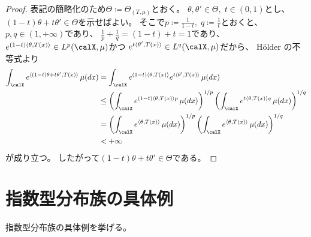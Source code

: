 \documentclass[report]{jlreq}
\begin{document}
\begin{proof}
    表記の簡略化のため$\Theta \coloneqq \Theta_{(T, \mu)}$とおく。
    $\theta, \theta' \in \Theta, \; t \in (0, 1)$とし、
    $(1 - t) \theta + t \theta' \in \Theta$を示せばよい。
    そこで$p \coloneqq \frac{1}{1 - t}, \; q \coloneqq \frac{1}{t}$とおくと、
    $p, q \in (1, +\infty)$であり、
    $\frac{1}{p} + \frac{1}{q} = (1 - t) + t = 1$であり、
    $e^{(1 - t)\langle \theta, T(x) \rangle} \in L^p(\calX, \mu)$かつ
    $e^{t \langle \theta', T(x) \rangle} \in L^q(\calX, \mu)$だから、
    H\"older の不等式より
    \begin{alignat}{1}
        \int_\calX e^{\langle (1 - t) \theta + t \theta', T(x) \rangle} \, \mu(dx)
            &= \int_\calX
                e^{(1 - t) \langle \theta, T(x) \rangle}
                e^{t \langle \theta', T(x) \rangle}
                \, \mu(dx) \\
            &\le \myparen{
                \int_\calX
                e^{(1 - t) \langle \theta, T(x) \rangle p}
                \, \mu(dx)
            }^{1 / p}
            \myparen{
                \int_\calX
                e^{t \langle \theta, T(x) \rangle q}
                \, \mu(dx)
            }^{1 / q} \\
            &= \myparen{
                \int_\calX
                e^{\langle \theta, T(x) \rangle}
                \, \mu(dx)
            }^{1 / p}
            \myparen{
                \int_\calX
                e^{\langle \theta, T(x) \rangle}
                \, \mu(dx)
            }^{1 / q} \\
            &< +\infty
    \end{alignat}
    が成り立つ。
    したがって$(1 - t) \theta + t \theta' \in \Theta$である。
\end{proof}

%
\section{指数型分布族の具体例}

指数型分布族の具体例を挙げる。
\end{document}
